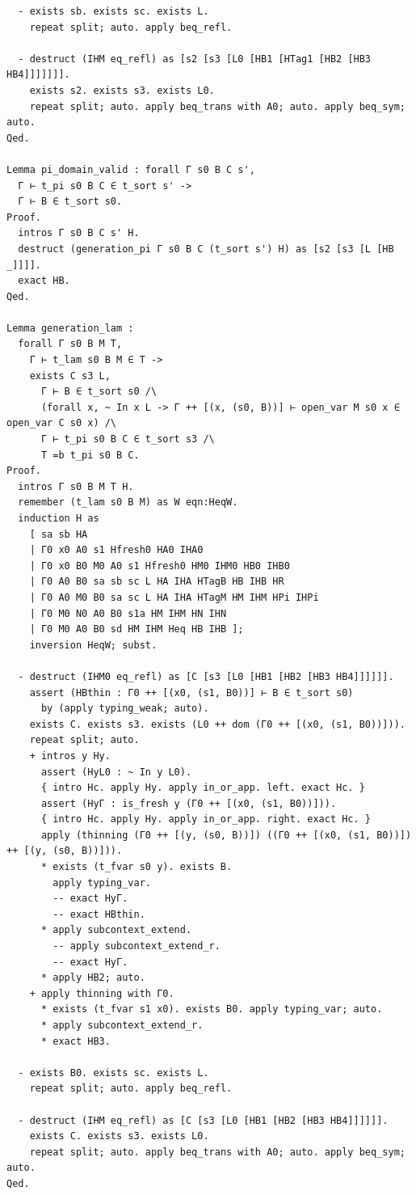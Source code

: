 \begin{latin}
\begin{verbatim}
  - exists sb. exists sc. exists L.
    repeat split; auto. apply beq_refl.

  - destruct (IHM eq_refl) as [s2 [s3 [L0 [HB1 [HTag1 [HB2 [HB3 HB4]]]]]]].
    exists s2. exists s3. exists L0.
    repeat split; auto. apply beq_trans with A0; auto. apply beq_sym; auto.
Qed.

Lemma pi_domain_valid : forall Γ s0 B C s',
  Γ ⊢ t_pi s0 B C ∈ t_sort s' ->
  Γ ⊢ B ∈ t_sort s0.
Proof.
  intros Γ s0 B C s' H.
  destruct (generation_pi Γ s0 B C (t_sort s') H) as [s2 [s3 [L [HB _]]]].
  exact HB.
Qed.

Lemma generation_lam :
  forall Γ s0 B M T,
    Γ ⊢ t_lam s0 B M ∈ T ->
    exists C s3 L,
      Γ ⊢ B ∈ t_sort s0 /\
      (forall x, ~ In x L -> Γ ++ [(x, (s0, B))] ⊢ open_var M s0 x ∈ open_var C s0 x) /\
      Γ ⊢ t_pi s0 B C ∈ t_sort s3 /\
      T =b t_pi s0 B C.
Proof.
  intros Γ s0 B M T H.
  remember (t_lam s0 B M) as W eqn:HeqW.
  induction H as
    [ sa sb HA
    | Γ0 x0 A0 s1 Hfresh0 HA0 IHA0
    | Γ0 x0 B0 M0 A0 s1 Hfresh0 HM0 IHM0 HB0 IHB0
    | Γ0 A0 B0 sa sb sc L HA IHA HTagB HB IHB HR
    | Γ0 A0 M0 B0 sa sc L HA IHA HTagM HM IHM HPi IHPi
    | Γ0 M0 N0 A0 B0 s1a HM IHM HN IHN
    | Γ0 M0 A0 B0 sd HM IHM Heq HB IHB ];
    inversion HeqW; subst.

  - destruct (IHM0 eq_refl) as [C [s3 [L0 [HB1 [HB2 [HB3 HB4]]]]]].
    assert (HBthin : Γ0 ++ [(x0, (s1, B0))] ⊢ B ∈ t_sort s0)
      by (apply typing_weak; auto).
    exists C. exists s3. exists (L0 ++ dom (Γ0 ++ [(x0, (s1, B0))])).
    repeat split; auto.
    + intros y Hy.
      assert (HyL0 : ~ In y L0).
      { intro Hc. apply Hy. apply in_or_app. left. exact Hc. }
      assert (HyΓ : is_fresh y (Γ0 ++ [(x0, (s1, B0))])).
      { intro Hc. apply Hy. apply in_or_app. right. exact Hc. }
      apply (thinning (Γ0 ++ [(y, (s0, B))]) ((Γ0 ++ [(x0, (s1, B0))]) ++ [(y, (s0, B))])).
      * exists (t_fvar s0 y). exists B.
        apply typing_var.
        -- exact HyΓ.
        -- exact HBthin.
      * apply subcontext_extend.
        -- apply subcontext_extend_r.
        -- exact HyΓ.
      * apply HB2; auto.
    + apply thinning with Γ0.
      * exists (t_fvar s1 x0). exists B0. apply typing_var; auto.
      * apply subcontext_extend_r.
      * exact HB3.

  - exists B0. exists sc. exists L.
    repeat split; auto. apply beq_refl.

  - destruct (IHM eq_refl) as [C [s3 [L0 [HB1 [HB2 [HB3 HB4]]]]]].
    exists C. exists s3. exists L0.
    repeat split; auto. apply beq_trans with A0; auto. apply beq_sym; auto.
Qed.


\end{verbatim}
\end{latin}
